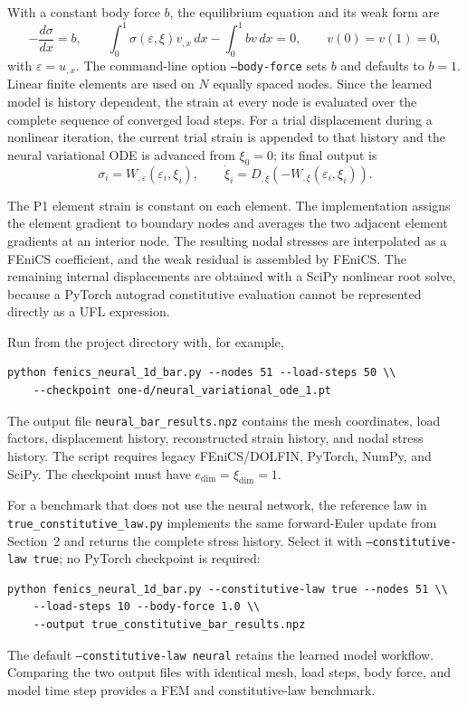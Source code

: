\documentclass[11pt]{article}
\begin{document}
With a constant body force $b$, the equilibrium equation and its weak form are
\begin{equation}
    -\frac{d\sigma}{dx}=b,
    \qquad
    \int_0^1 \sigma(\varepsilon,\xi) v_{,x}\,dx
    -\int_0^1 b v\,dx=0,
    \qquad v(0)=v(1)=0,
\end{equation}
with $\varepsilon=u_{,x}$. The command-line option
\texttt{--body-force} sets $b$ and defaults to $b=1$. Linear finite elements are used on $N$ equally
spaced nodes. Since the learned model is history dependent, the strain at
every node is evaluated over the complete sequence of converged load steps.
For a trial displacement during a nonlinear iteration, the current trial
strain is appended to that history and the neural variational ODE is advanced
from $\xi_0=0$; its final output is
\begin{equation}
    \sigma_i=W_{,\varepsilon}(\varepsilon_i,\xi_i),
    \qquad
    \dot{\xi}_i=D_{,\dot{\xi}}(-W_{,\xi}(\varepsilon_i,\xi_i)).
\end{equation}

The P1 element strain is constant on each element. The implementation assigns
the element gradient to boundary nodes and averages the two adjacent element
gradients at an interior node. The resulting nodal stresses are interpolated
as a FEniCS coefficient, and the weak residual is assembled by FEniCS. The
remaining internal displacements are obtained with a SciPy nonlinear root
solve, because a PyTorch autograd constitutive evaluation cannot be represented
directly as a UFL expression.

Run from the project directory with, for example,
\begin{verbatim}
python fenics_neural_1d_bar.py --nodes 51 --load-steps 50 \\
    --checkpoint one-d/neural_variational_ode_1.pt
\end{verbatim}
The output file \texttt{neural\_bar\_results.npz} contains the mesh coordinates,
load factors, displacement history, reconstructed strain history, and nodal
stress history. The script requires legacy FEniCS/DOLFIN, PyTorch, NumPy, and
SciPy. The checkpoint must have $e_{\mathrm{dim}}=\xi_{\mathrm{dim}}=1$.

For a benchmark that does not use the neural network, the reference law in
\texttt{true\_constitutive\_law.py} implements the same forward-Euler update
from Section~2 and returns the complete stress history. Select it with
\texttt{--constitutive-law true}; no PyTorch checkpoint is required:
\begin{verbatim}
python fenics_neural_1d_bar.py --constitutive-law true --nodes 51 \\
    --load-steps 10 --body-force 1.0 \\
    --output true_constitutive_bar_results.npz
\end{verbatim}
The default \texttt{--constitutive-law neural} retains the learned model
workflow. Comparing the two output files with identical mesh, load steps,
body force, and model time step provides a FEM and constitutive-law benchmark.
\end{document}
